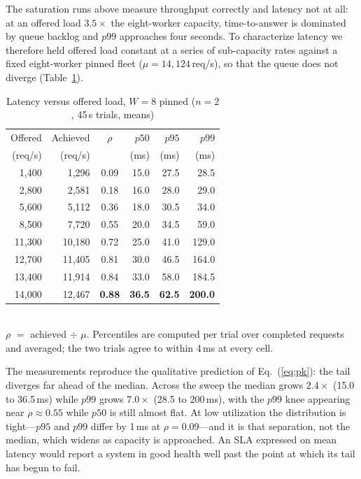 \documentclass[conference]{IEEEtran}
\begin{document}
The saturation runs above measure throughput correctly and latency not at all: at an offered load $3.5\times$ the eight-worker capacity, time-to-answer is dominated by queue backlog and $p99$ approaches four seconds. To characterize latency we therefore held offered load constant at a series of sub-capacity rates against a fixed eight-worker pinned fleet ($\mu = 14{,}124$\,req/s), so that the queue does not diverge (Table~\ref{tab:latency}).

\begin{table}[t]
\caption{Latency versus offered load, $W{=}8$ pinned ($n{=}2$, 45\,s trials, means)}
\label{tab:latency}
\centering\small\setlength{\tabcolsep}{3.5pt}
\begin{tabular}{@{}rrcrrr@{}}
\toprule
Offered & Achieved & $\rho$ & $p50$ & $p95$ & $p99$ \\
(req/s) & (req/s) & & (ms) & (ms) & (ms) \\
\midrule
1{,}400  & 1{,}296  & 0.09 & 15.0 & 27.5 & 28.5 \\
2{,}800  & 2{,}581  & 0.18 & 16.0 & 28.0 & 29.0 \\
5{,}600  & 5{,}112  & 0.36 & 18.0 & 30.5 & 34.0 \\
8{,}500  & 7{,}720  & 0.55 & 20.0 & 34.5 & 59.0 \\
11{,}300 & 10{,}180 & 0.72 & 25.0 & 41.0 & 129.0 \\
12{,}700 & 11{,}405 & 0.81 & 30.0 & 46.5 & 164.0 \\
13{,}400 & 11{,}914 & 0.84 & 33.0 & 58.0 & 184.5 \\
14{,}000 & 12{,}467 & \textbf{0.88} & \textbf{36.5} & \textbf{62.5} & \textbf{200.0} \\
\bottomrule
\end{tabular}
\\[2pt]\footnotesize $\rho$ $=$ achieved $\div$ $\mu$. Percentiles are computed per trial over completed requests and averaged; the two trials agree to within 4\,ms at every cell.
\end{table}

The measurements reproduce the qualitative prediction of Eq.~(\ref{eq:pk}): the tail diverges far ahead of the median. Across the sweep the median grows $2.4\times$ (15.0 to 36.5\,ms) while $p99$ grows $7.0\times$ (28.5 to 200\,ms), with the $p99$ knee appearing near $\rho\approx0.55$ while $p50$ is still almost flat. At low utilization the distribution is tight---$p95$ and $p99$ differ by 1\,ms at $\rho=0.09$---and it is that separation, not the median, which widens as capacity is approached. An SLA expressed on mean latency would report a system in good health well past the point at which its tail has begun to fail.
\end{document}
